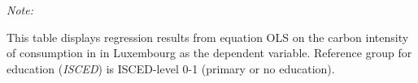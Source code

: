 \begin{table}[htbp!]
\begin{adjustbox}{width = 1\textwidth, max height = 0.95\textheight, center}
\begin{threeparttable}[b]
         \begin{tablenotes}\item \medskip \textit{Note:}
            \item This table displays regression results from equation OLS on the carbon intensity of consumption in  in Luxembourg as the dependent variable. Reference group for education (\textit{ISCED}) is ISCED-level 0-1 (primary or no education).
         \end{tablenotes}
      \end{threeparttable}
   \end{adjustbox}
\end{table}


